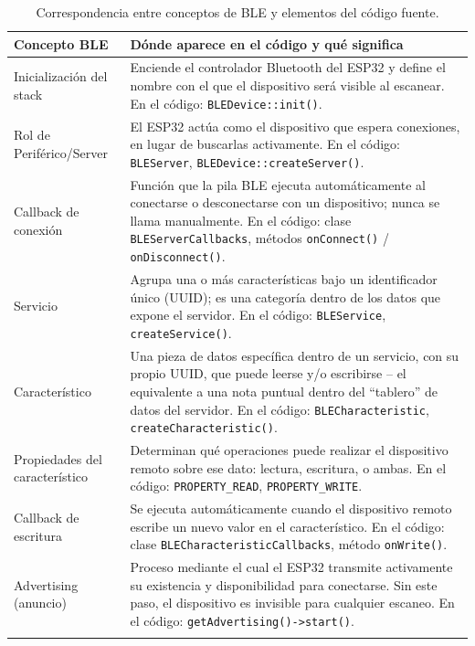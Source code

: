 \documentclass[12pt,a4paper]{article}
\begin{document}
\begin{table}[H]
    \centering
    \renewcommand{\arraystretch}{1.3}
    \begin{tabularx}{\textwidth}{@{} >{\raggedright\arraybackslash}p{3.6cm} X @{}}
        \toprule
        \textbf{Concepto BLE} & \textbf{Dónde aparece en el código y qué significa} \\
        \midrule
        Inicialización del stack &
        Enciende el controlador Bluetooth del ESP32 y define el nombre con el que el dispositivo será visible al escanear. En el código: \texttt{BLEDevice::init()}. \\
        \addlinespace
        Rol de Periférico/Server &
        El ESP32 actúa como el dispositivo que espera conexiones, en lugar de buscarlas activamente. En el código: \texttt{BLEServer}, \texttt{BLEDevice::createServer()}. \\
        \addlinespace
        Callback de conexión &
        Función que la pila BLE ejecuta automáticamente al conectarse o desconectarse con un dispositivo; nunca se llama manualmente. En el código: clase \texttt{BLEServerCallbacks}, métodos \texttt{onConnect()} / \texttt{onDisconnect()}. \\
        \addlinespace
        Servicio &
        Agrupa una o más características bajo un identificador único (UUID); es una categoría dentro de los datos que expone el servidor. En el código: \texttt{BLEService}, \texttt{createService()}. \\
        \addlinespace
        Característico &
        Una pieza de datos específica dentro de un servicio, con su propio UUID, que puede leerse y/o escribirse -- el equivalente a una nota puntual dentro del ``tablero'' de datos del servidor. En el código: \texttt{BLECharacteristic}, \texttt{createCharacteristic()}. \\
        \addlinespace
        Propiedades del característico &
        Determinan qué operaciones puede realizar el dispositivo remoto sobre ese dato: lectura, escritura, o ambas. En el código: \texttt{PROPERTY\_READ}, \texttt{PROPERTY\_WRITE}. \\
        \addlinespace
        Callback de escritura &
        Se ejecuta automáticamente cuando el dispositivo remoto escribe un nuevo valor en el característico. En el código: clase \texttt{BLECharacteristicCallbacks}, método \texttt{onWrite()}. \\
        \addlinespace
        Advertising (anuncio) &
        Proceso mediante el cual el ESP32 transmite activamente su existencia y disponibilidad para conectarse. Sin este paso, el dispositivo es invisible para cualquier escaneo. En el código: \texttt{getAdvertising()->start()}. \\
        \addlinespace
        \bottomrule
    \end{tabularx}
    \caption{Correspondencia entre conceptos de BLE y elementos del código fuente.}
\end{table}
\end{document}
